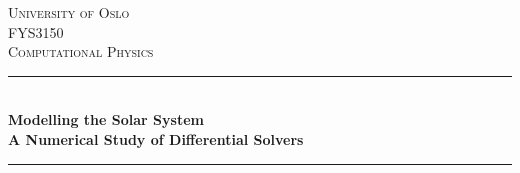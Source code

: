 	\begin{titlepage} %
		\newcommand{\HRule}{\rule{\linewidth}{0.5mm}} %
		
		\center %
		
		
		\textsc{\LARGE University of Oslo}\\[1.5cm] %
		
		\textsc{\Large FYS3150}\\[0.5cm] %
		
		\textsc{\large Computational Physics}\\[0.5cm] %
		
		
		\HRule\\[0.4cm]
		
		{\huge\bfseries Modelling the Solar System \\ A Numerical Study of Differential Solvers}\\[0.4cm] %
		
		\HRule\\[1.5cm]
		
		
		

\end{titlepage}
